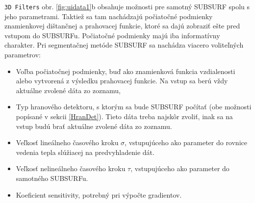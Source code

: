 \documentclass[a4paper,11pt,oneside]{article}%
\begin{document}
\texttt{3D Filters} obr. \ref{fig:uidata1}b obsahuje možnosti pre samotný SUBSURF spolu s jeho parametrami. Taktiež sa tam nachádzajú počiatočné podmienky znamienkovej dištančnej a prahovacej funkcie, ktoré sa dajú zobraziť ešte pred vstupom do SUBSURFu. Počiatočné podmienky majú iba informatívny charakter. Pri segmentačnej metóde SUBSURF sa nachádza viacero voliteľných parametrov:
\begin{itemize}
\item Voľba počiatočnej podmienky, buď ako znamienková funkcia vzdialenosti alebo  vytvorená z výsledku prahovacej funkcie. Na vstup sa berú vždy aktuálne zvolené dáta zo zoznamu,
\item Typ hranového detektoru, s ktorým sa bude SUBSURF počítať (obe možnosti popísané v sekcii \ref{HranDet}). Tieto dáta treba najskôr zvoliť, inak sa na vstup budú brať aktuálne zvolené dáta zo zoznamu.
\item Veľkosť lineálneho časového kroku $\sigma$, vstupujúceho ako parameter do rovnice vedenia tepla slúžiacej na predvyhladenie dát.  
\item Veľkosť nelineálneho časového kroku $\tau$, vstupujúceho ako parameter do samotného SUBSURFu.  
\item Koeficient sensitivity, potrebný pri výpočte gradientov.
\end{itemize}
\end{document}
